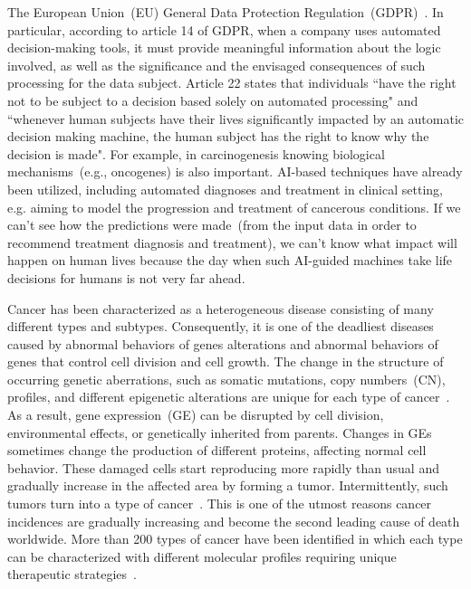 \hspace*{3.5mm} The European Union~(EU) General Data Protection Regulation~(GDPR)~\cite{kaminski2019right}. In particular, according to article 14 of GDPR, when a company uses automated decision-making tools, it must provide meaningful information about the logic involved, as well as the significance and the envisaged consequences of such processing for the data subject. Article 22 states that individuals ``have the right not to be subject to a decision based solely on automated processing" and ``whenever human subjects have their lives significantly impacted by an automatic decision making machine, the human subject has the right to know why the decision is made". For example, in carcinogenesis knowing biological mechanisms~(e.g., oncogenes) is also important. AI-based techniques have already been utilized, including automated diagnoses and treatment in clinical setting, e.g. aiming to model the progression and treatment of cancerous conditions. If we can’t see how the predictions were made~(from the input data in order to recommend treatment diagnosis and treatment), we can’t know what impact will happen on human lives because the day when such AI-guided machines take life decisions for humans is not very far ahead. 

\hspace*{3.5mm} Cancer has been characterized as a heterogeneous disease consisting of many different types and subtypes. Consequently, it is one of the deadliest diseases caused by abnormal behaviors of genes alterations and abnormal behaviors of genes that control cell division and cell growth. The change in the structure of occurring genetic aberrations, such as somatic mutations, copy numbers~(CN), profiles, and different epigenetic alterations are unique for each type of cancer~\cite{82Tomczak,13cancerdef,19Cruz}. As a result, gene expression~(GE) can be disrupted by cell division, environmental effects, or genetically inherited from parents. Changes in GEs sometimes change the production of different proteins, affecting normal cell behavior. These damaged cells start reproducing more rapidly than usual and gradually increase in the affected area by forming a tumor. Intermittently, such tumors turn into a type of cancer~\cite{zuo2019identification,24Podolsky}. This is one of the utmost reasons cancer incidences are gradually increasing and become the second leading cause of death worldwide. More than 200 types of cancer have been identified in which each type can be characterized with different molecular profiles requiring unique therapeutic strategies~\cite{82Tomczak}. 

